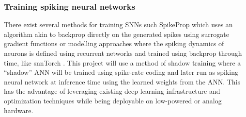 \documentclass[a4paper,11pt]{article} %
\begin{document}
\subsubsection{Training spiking neural networks}
There exist several methods for training SNNs such SpikeProp \cite{Boht2000SpikePropBF} which uses an algorithm akin to backprop directly on the generated spikes using surrogate gradient functions or modelling approaches where the spiking dynamics of neurons is defined using recurrent networks and trained using backprop through time, like snnTorch \cite{eshraghian2021training}. This project will use a method of shadow training where a ``shadow'' ANN will be trained using spike-rate coding and later run as spiking neural network at inference time using the learned weights from the ANN. This has the advantage of leveraging existing deep learning infrastructure and optimization techniques while being deployable on low-powered or analog hardware. 
\end{document}

